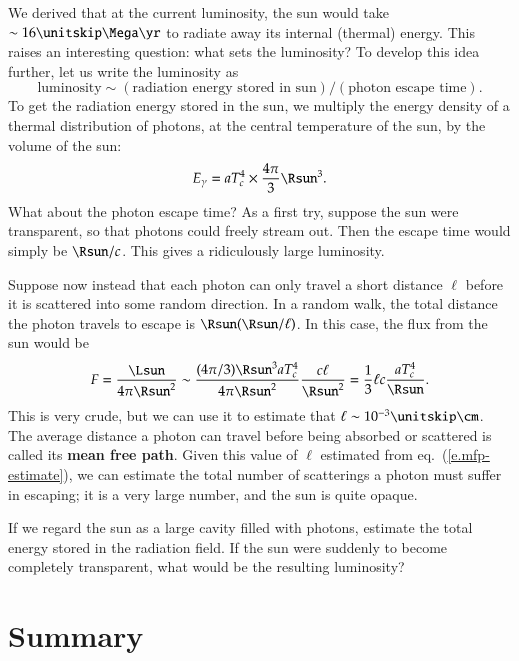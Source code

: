 We derived that at the current luminosity, the sun would take $\sim 16\nsp\Mega\yr$ to radiate away its internal (thermal) energy.  This raises an interesting question: what sets the luminosity?  To develop this idea further, let us write the luminosity as 
\[ \textrm{luminosity} \sim (\textrm{radiation energy stored in sun})/(\textrm{photon escape time}). \]
To get the radiation energy stored in the sun, we multiply the energy density of a thermal distribution of photons, at the central temperature of the sun, by the volume of the sun:
\begin{equation}\label{e.photon-energy-of-sun}
E_{\gamma} = aT_{c}^{4} \times \frac{4\pi}{3}\Rsun^{3}.
\end{equation}
What about the photon escape time? As a first try, suppose the sun were transparent, so that photons could freely stream out. Then the escape time would simply be $\Rsun/c$. This gives a ridiculously large luminosity.

Suppose now instead that each photon can only travel a short distance $\ell$ before it is scattered into some random direction.  In a random walk, the total distance the photon travels to escape is $\Rsun(\Rsun/\ell)$.  In this case, the flux from the sun would be
\begin{equation}\label{e.mfp-estimate}
F = \frac{\Lsun}{4\pi\Rsun^{2}} \sim \frac{(4\pi/3)\Rsun^{3} aT_{c}^{4}}{4\pi\Rsun^{2}} \frac{c\ell}{\Rsun^{2}} = \frac{1}{3} \ell c \frac{aT_{c}^{4}}{\Rsun}.
\end{equation}
This is very crude, but we can use it to estimate that $\ell \sim 10^{-3}\nsp\cm$.  The average distance a photon can travel before being absorbed or scattered is called its \textbf{mean free path}.  Given this value of $\ell$ estimated from eq.~(\ref{e.mfp-estimate}), we can estimate the total number of scatterings a photon must suffer in escaping; it is a very large number, and the sun is quite opaque.


\begin{exercisebox}
If we regard the sun as a large cavity filled with photons, estimate the total energy stored in the radiation field.  If the sun were suddenly to become completely transparent, what would be the resulting luminosity?
\end{exercisebox}

\section{Summary}

